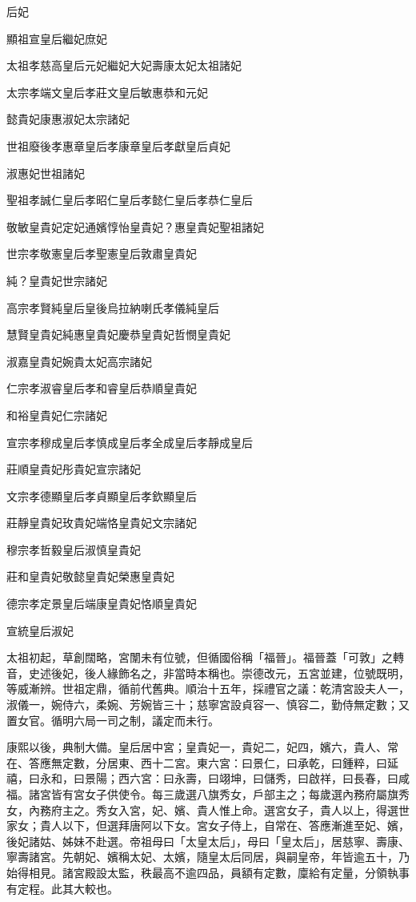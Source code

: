 
\begin{pinyinscope}
后妃

顯祖宣皇后繼妃庶妃

太祖孝慈高皇后元妃繼妃大妃壽康太妃太祖諸妃

太宗孝端文皇后孝莊文皇后敏惠恭和元妃

懿貴妃康惠淑妃太宗諸妃

世祖廢後孝惠章皇后孝康章皇后孝獻皇后貞妃

淑惠妃世祖諸妃

聖祖孝誠仁皇后孝昭仁皇后孝懿仁皇后孝恭仁皇后

敬敏皇貴妃定妃通嬪惇怡皇貴妃？惠皇貴妃聖祖諸妃

世宗孝敬憲皇后孝聖憲皇后敦肅皇貴妃

純？皇貴妃世宗諸妃

高宗孝賢純皇后皇後烏拉納喇氏孝儀純皇后

慧賢皇貴妃純惠皇貴妃慶恭皇貴妃哲憫皇貴妃

淑嘉皇貴妃婉貴太妃高宗諸妃

仁宗孝淑睿皇后孝和睿皇后恭順皇貴妃

和裕皇貴妃仁宗諸妃

宣宗孝穆成皇后孝慎成皇后孝全成皇后孝靜成皇后

莊順皇貴妃彤貴妃宣宗諸妃

文宗孝德顯皇后孝貞顯皇后孝欽顯皇后

莊靜皇貴妃玫貴妃端恪皇貴妃文宗諸妃

穆宗孝哲毅皇后淑慎皇貴妃

莊和皇貴妃敬懿皇貴妃榮惠皇貴妃

德宗孝定景皇后端康皇貴妃恪順皇貴妃

宣統皇后淑妃

太祖初起，草創闊略，宮闈未有位號，但循國俗稱「福晉」。福晉蓋「可敦」之轉音，史述後妃，後人緣飾名之，非當時本稱也。崇德改元，五宮並建，位號既明，等威漸辨。世祖定鼎，循前代舊典。順治十五年，採禮官之議：乾清宮設夫人一，淑儀一，婉侍六，柔婉、芳婉皆三十；慈寧宮設貞容一、慎容二，勤侍無定數；又置女官。循明六局一司之制，議定而未行。

康熙以後，典制大備。皇后居中宮；皇貴妃一，貴妃二，妃四，嬪六，貴人、常在、答應無定數，分居東、西十二宮。東六宮：曰景仁，曰承乾，曰鍾粹，曰延禧，曰永和，曰景陽；西六宮：曰永壽，曰翊坤，曰儲秀，曰啟祥，曰長春，曰咸福。諸宮皆有宮女子供使令。每三歲選八旗秀女，戶部主之；每歲選內務府屬旗秀女，內務府主之。秀女入宮，妃、嬪、貴人惟上命。選宮女子，貴人以上，得選世家女；貴人以下，但選拜唐阿以下女。宮女子侍上，自常在、答應漸進至妃、嬪，後妃諸姑、姊妹不赴選。帝祖母曰「太皇太后」，母曰「皇太后」，居慈寧、壽康、寧壽諸宮。先朝妃、嬪稱太妃、太嬪，隨皇太后同居，與嗣皇帝，年皆逾五十，乃始得相見。諸宮殿設太監，秩最高不逾四品，員額有定數，廩給有定量，分領執事有定程。此其大較也。


\end{pinyinscope}
